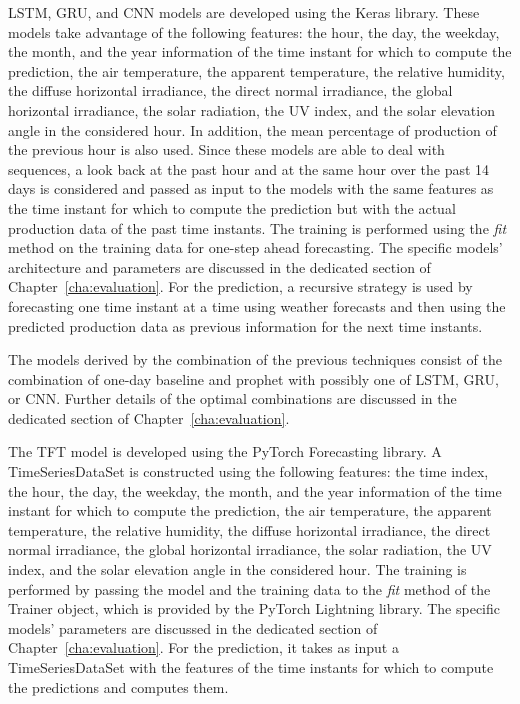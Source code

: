LSTM, GRU, and CNN models are developed using the Keras library.
These models take advantage of the following features: the hour, the day, the weekday, the month, and the year information of the time instant for which to compute the prediction, the air temperature, the apparent temperature, the relative humidity, the diffuse horizontal irradiance, the direct normal irradiance, the global horizontal irradiance, the solar radiation, the UV index, and the solar elevation angle in the considered hour.
In addition, the mean percentage of production of the previous hour is also used.
Since these models are able to deal with sequences, a look back at the past hour and at the same hour over the past 14 days is considered and passed as input to the models with the same features as the time instant for which to compute the prediction but with the actual production data of the past time instants.
The training is performed using the \emph{fit} method on the training data for one-step ahead forecasting.
The specific models' architecture and parameters are discussed in the dedicated section of Chapter~\ref{cha:evaluation}.
For the prediction, a recursive strategy is used by forecasting one time instant at a time using weather forecasts and then using the predicted production data as previous information for the next time instants.

The models derived by the combination of the previous techniques consist of the combination of one-day baseline and prophet with possibly one of LSTM, GRU, or CNN.
Further details of the optimal combinations are discussed in the dedicated section of Chapter~\ref{cha:evaluation}.

The TFT model is developed using the PyTorch Forecasting library.
A TimeSeriesDataSet is constructed using the following features: the time index, the hour, the day, the weekday, the month, and the year information of the time instant for which to compute the prediction, the air temperature, the apparent temperature, the relative humidity, the diffuse horizontal irradiance, the direct normal irradiance, the global horizontal irradiance, the solar radiation, the UV index, and the solar elevation angle in the considered hour.
The training is performed by passing the model and the training data to the \emph{fit} method of the Trainer object, which is provided by the PyTorch Lightning library.
The specific models' parameters are discussed in the dedicated section of Chapter~\ref{cha:evaluation}.
For the prediction, it takes as input a TimeSeriesDataSet with the features of the time instants for which to compute the predictions and computes them.

